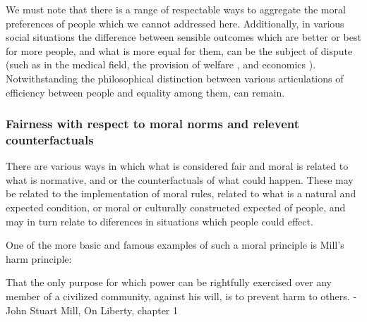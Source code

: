 We must note that there is a range of respectable ways to aggregate the moral preferences of people which we cannot addressed here.
Additionally, in various social situations the difference between sensible outcomes which are better or best for more people, and what is more equal for them, can be the subject of dispute (such as in the medical field\cite{Reidpath2012,RePEc:chy:respap:120cherp}, the provision of welfare \cite{10.2307/27522452}, and economics \cite{10.1093/oep/gpz040}). Notwithstanding the philosophical distinction between various articulations of efficiency between people and equality among them, can remain.



\subsubsection{Fairness with respect to moral norms and relevent counterfactuals}

There are various ways in which what is considered fair and moral is related to what is normative, and or the counterfactuals of what could happen.
These may be related to the implementation of moral rules, related to what is a natural and expected condition, or moral or culturally constructed expected of people, and may in turn relate to diferences in situations which people could effect.

One of the more basic and famous examples of such a moral principle is Mill's harm principle:

\begin{displayquote}
That the only purpose for which power can be rightfully exercised over any member of a civilized community, against his will, is to prevent harm to others. - John Stuart Mill, On Liberty, chapter 1 \cite{Mill2Gutenberg}
\end{displayquote}

